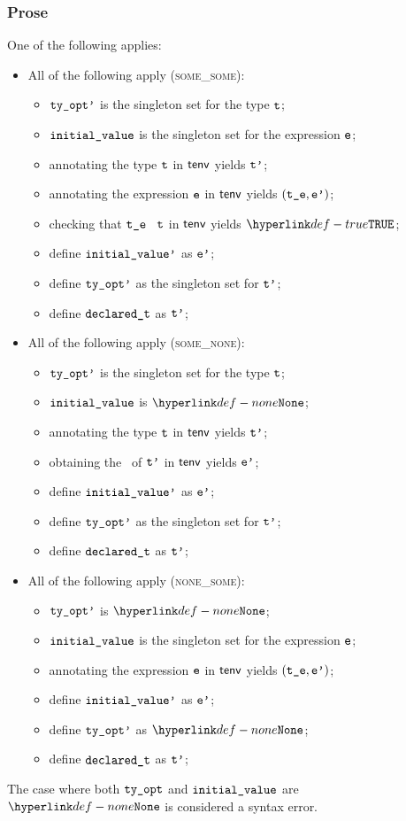 \subsubsection{Prose}
One of the following applies:
\begin{itemize}
  \item All of the following apply (\textsc{some\_some}):
  \begin{itemize}
    \item $\texttt{ty\_opt'}$ is the singleton set for the type $\texttt{t}$;
    \item $\texttt{initial\_value}$ is the singleton set for the expression $\texttt{e}$;
    \item annotating the type $\texttt{t}$ in $\textsf{tenv}$ yields $\texttt{t'}$\ProseOrTypeError;
    \item annotating the expression $\texttt{e}$ in $\textsf{tenv}$ yields $(\texttt{t\_e}, \texttt{e'})$\ProseOrTypeError;
    \item checking that $\texttt{t\_e}$ \typesatisfies\ $\texttt{t}$ in $\textsf{tenv}$ yields $\True$\ProseOrTypeError;
    \item define $\texttt{initial\_value'}$ as $\texttt{e'}$;
    \item define $\texttt{ty\_opt'}$ as the singleton set for $\texttt{t'}$;
    \item define $\texttt{declared\_t}$ as $\texttt{t'}$;
  \end{itemize}

  \item All of the following apply (\textsc{some\_none}):
  \begin{itemize}
    \item $\texttt{ty\_opt'}$ is the singleton set for the type $\texttt{t}$;
    \item $\texttt{initial\_value}$ is $\None$;
    \item annotating the type $\texttt{t}$ in $\textsf{tenv}$ yields $\texttt{t'}$\ProseOrTypeError;
    \item obtaining the \basevalueterm\ of $\texttt{t'}$ in $\textsf{tenv}$ yields $\texttt{e'}$\ProseOrTypeError;
    \item define $\texttt{initial\_value'}$ as $\texttt{e'}$;
    \item define $\texttt{ty\_opt'}$ as the singleton set for $\texttt{t'}$;
    \item define $\texttt{declared\_t}$ as $\texttt{t'}$;
  \end{itemize}

  \item All of the following apply (\textsc{none\_some}):
  \begin{itemize}
    \item $\texttt{ty\_opt'}$ is $\None$;
    \item $\texttt{initial\_value}$ is the singleton set for the expression $\texttt{e}$;
    \item annotating the expression $\texttt{e}$ in $\textsf{tenv}$ yields $(\texttt{t\_e}, \texttt{e'})$\ProseOrTypeError;
    \item define $\texttt{initial\_value'}$ as $\texttt{e'}$;
    \item define $\texttt{ty\_opt'}$ as $\None$;
    \item define $\texttt{declared\_t}$ as $\texttt{t'}$;
  \end{itemize}
\end{itemize}
The case where both $\texttt{ty\_opt}$ and $\texttt{initial\_value}$ are $\None$ is considered a syntax error.

